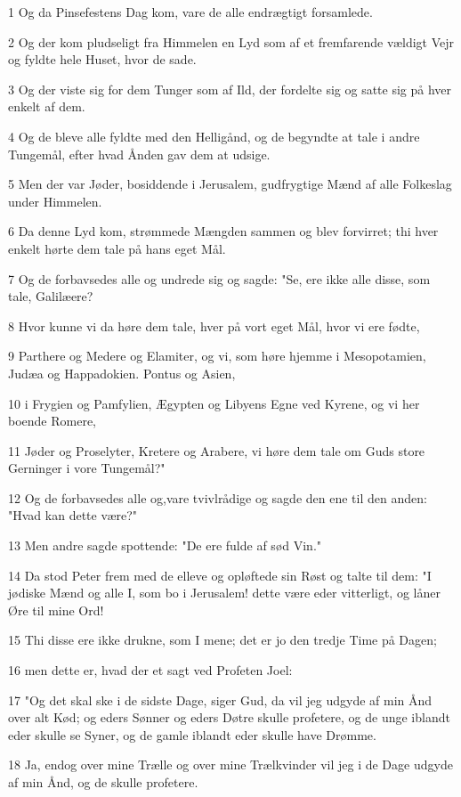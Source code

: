 \par 1 Og da Pinsefestens Dag kom, vare de alle endrægtigt forsamlede.
\par 2 Og der kom pludseligt fra Himmelen en Lyd som af et fremfarende vældigt Vejr og fyldte hele Huset, hvor de sade.
\par 3 Og der viste sig for dem Tunger som af Ild, der fordelte sig og satte sig på hver enkelt af dem.
\par 4 Og de bleve alle fyldte med den Helligånd, og de begyndte at tale i andre Tungemål, efter hvad Ånden gav dem at udsige.
\par 5 Men der var Jøder, bosiddende i Jerusalem, gudfrygtige Mænd af alle Folkeslag under Himmelen.
\par 6 Da denne Lyd kom, strømmede Mængden sammen og blev forvirret; thi hver enkelt hørte dem tale på hans eget Mål.
\par 7 Og de forbavsedes alle og undrede sig og sagde: "Se, ere ikke alle disse, som tale, Galilæere?
\par 8 Hvor kunne vi da høre dem tale, hver på vort eget Mål, hvor vi ere fødte,
\par 9 Parthere og Medere og Elamiter, og vi, som høre hjemme i Mesopotamien, Judæa og Happadokien. Pontus og Asien,
\par 10 i Frygien og Pamfylien, Ægypten og Libyens Egne ved Kyrene, og vi her boende Romere,
\par 11 Jøder og Proselyter, Kretere og Arabere, vi høre dem tale om Guds store Gerninger i vore Tungemål?"
\par 12 Og de forbavsedes alle og,vare tvivlrådige og sagde den ene til den anden: "Hvad kan dette være?"
\par 13 Men andre sagde spottende: "De ere fulde af sød Vin."
\par 14 Da stod Peter frem med de elleve og opløftede sin Røst og talte til dem: "I jødiske Mænd og alle I, som bo i Jerusalem! dette være eder vitterligt, og låner Øre til mine Ord!
\par 15 Thi disse ere ikke drukne, som I mene; det er jo den tredje Time på Dagen;
\par 16 men dette er, hvad der et sagt ved Profeten Joel:
\par 17 "Og det skal ske i de sidste Dage, siger Gud, da vil jeg udgyde af min Ånd over alt Kød; og eders Sønner og eders Døtre skulle profetere, og de unge iblandt eder skulle se Syner, og de gamle iblandt eder skulle have Drømme.
\par 18 Ja, endog over mine Trælle og over mine Trælkvinder vil jeg i de Dage udgyde af min Ånd, og de skulle profetere.
